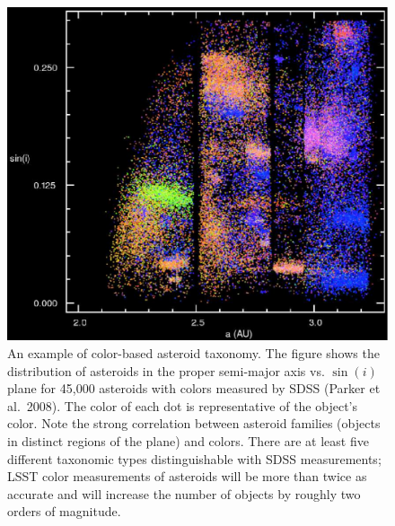 \begin{figure}
\includegraphics[width=1.0\hsize,clip]{asteroids.pdf}
\caption{An example of color-based asteroid taxonomy. The figure
shows the distribution of asteroids in the proper semi-major axis vs. $\sin(i)$
plane for 45,000 asteroids with colors measured by SDSS (Parker et al.~2008).
The color of each dot is representative of the object's color.
Note the strong correlation between asteroid families (objects in distinct regions
of the plane) and colors. There are
at least five different taxonomic types distinguishable with SDSS measurements;
LSST color measurements of asteroids will be more than twice as accurate
and will increase the number of objects by roughly two orders of magnitude.}
\label{Fig:asteroids}
\end{figure}

